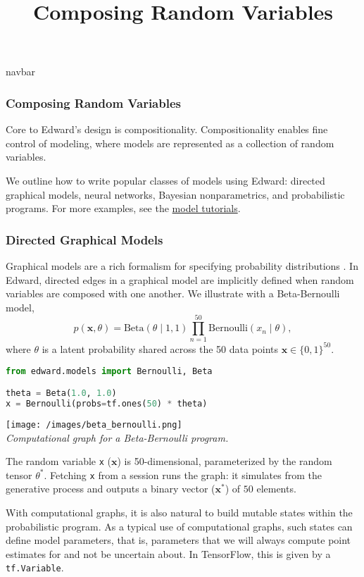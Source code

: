 \title{Composing Random Variables}

{{navbar}}

\subsubsection{Composing Random Variables}

Core to Edward's design is compositionality. Compositionality enables
fine control of modeling, where models are represented as a collection
of random variables.

We outline how to write popular classes of models using Edward:
directed graphical models, neural networks, Bayesian nonparametrics,
and probabilistic programs. For more examples, see the
\href{/tutorials/}{model tutorials}.

\subsubsection{Directed Graphical Models}

Graphical models are a rich formalism for specifying probability
distributions \citep{koller2009probabilistic}.
In Edward, directed edges in a graphical model are implicitly defined
when random variables are composed with one another. We illustrate
with a Beta-Bernoulli model,
\begin{equation*}
p(\mathbf{x}, \theta) =
\text{Beta}(\theta\mid 1, 1)
\prod_{n=1}^{50} \text{Bernoulli}(x_n\mid \theta),
\end{equation*}
where $\theta$ is a latent probability shared across the 50 data
points $\mathbf{x}\in\{0,1\}^{50}$.

\begin{lstlisting}[language=python]
from edward.models import Bernoulli, Beta

theta = Beta(1.0, 1.0)
x = Bernoulli(probs=tf.ones(50) * theta)
\end{lstlisting}

\texttt{[image: /images/beta\_bernoulli.png]} \\
{\small\textit{%
Computational graph for a Beta-Bernoulli program.
}}

The random variable \texttt{x} ($\mathbf{x}$) is 50-dimensional,
parameterized by the random tensor $\theta^*$. Fetching \texttt{x}
from a session runs the graph: it simulates from the generative process
and outputs a binary vector ($\mathbf{x}^*$) of $50$ elements.

With computational graphs, it is also natural to build mutable states
within the probabilistic program. As a typical use of computational
graphs, such states can define model parameters, that is, parameters
that we will always compute point estimates for and not be uncertain
about. In TensorFlow, this is given by a \texttt{tf.Variable}.

